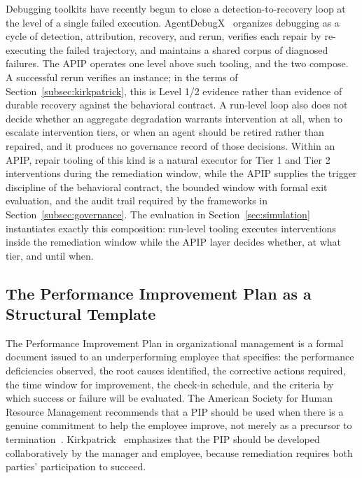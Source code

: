Debugging toolkits have recently begun to close a detection-to-recovery loop at
the level of a single failed execution. AgentDebugX~\cite{zhu2026agentdebugx}
organizes debugging as a cycle of detection, attribution, recovery, and rerun,
verifies each repair by re-executing the failed trajectory, and maintains a
shared corpus of diagnosed failures. The APIP operates one level above such
tooling, and the two compose. A successful rerun verifies an instance; in the
terms of Section~\ref{subsec:kirkpatrick}, this is Level 1/2 evidence rather
than evidence of durable recovery against the behavioral contract. A run-level
loop also does not decide whether an aggregate degradation warrants intervention
at all, when to escalate intervention tiers, or when an agent should be retired
rather than repaired, and it produces no governance record of those decisions.
Within an APIP, repair tooling of this kind is a natural executor for Tier 1 and
Tier 2 interventions during the remediation window, while the APIP supplies the
trigger discipline of the behavioral contract, the bounded window with formal
exit evaluation, and the audit trail required by the frameworks in
Section~\ref{subsec:governance}. The evaluation in
Section~\ref{sec:simulation} instantiates exactly this composition: run-level
tooling executes interventions inside the remediation window while the APIP
layer decides whether, at what tier, and until when.

\subsection{The Performance Improvement Plan as a Structural Template}
\label{subsec:pip-template}

The Performance Improvement Plan in organizational management is a formal
document issued to an underperforming employee that specifies: the performance
deficiencies observed, the root causes identified, the corrective actions
required, the time window for improvement, the check-in schedule, and the
criteria by which success or failure will be evaluated. The American Society
for Human Resource Management recommends that a PIP should be used when there
is a genuine commitment to help the employee improve, not merely as a precursor
to termination~\cite{kirkpatrick2016four}.
Kirkpatrick~\cite{kirkpatrick1994evaluating,kirkpatrick2016four} emphasizes
that the PIP should be developed collaboratively by the manager and employee,
because remediation requires both parties' participation to succeed.

